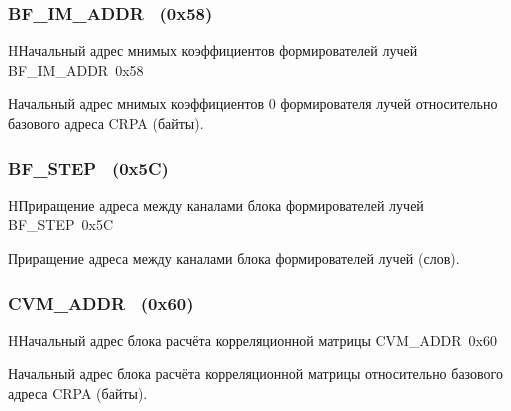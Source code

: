 \subsubsection{BF\_IM\_ADDR~ (0x58)}
\renewcommand{\regnam}{BF\_IM\_ADDR~}
\label{sec:BF_IM_ADDR}

\begin{register}{H}{Начальный адрес мнимых коэффициентов формирователей лучей \regnam}{0x58}

\label{regsamplecount}%
%
\regnewline%

\begin{regdesc}\begin{reglist}
\item [BF\_IM\_ADDR (rw)]
Начальный адрес мнимых коэффициентов 0 формирователя лучей относительно базового адреса
CRPA (байты).
\end{reglist}\end{regdesc}
\end{register}

\subsubsection{BF\_STEP~ (0x5C)}
\renewcommand{\regnam}{BF\_STEP~}
\label{sec:BF_STEP}

\begin{register}{H}{Приращение адреса между каналами блока формирователей лучей \regnam}{0x5C}

\label{regsamplecount}%
%
\regnewline%

\begin{regdesc}\begin{reglist}
\item [BF\_STEP (rw)]
Приращение адреса между каналами блока формирователей лучей (слов).
\end{reglist}\end{regdesc}
\end{register}

\subsubsection{CVM\_ADDR~ (0x60)}
\renewcommand{\regnam}{CVM\_ADDR~}
\label{sec:CVM_ADDR}

\begin{register}{H}{Начальный адрес блока расчёта корреляционной матрицы \regnam}{0x60}

  \label{regsamplecount}%
  \regnewline%

  \begin{regdesc}\begin{reglist}
    \item [CVM\_ADDR (rw)]
      Начальный адрес блока расчёта корреляционной матрицы относительно базового адреса
      CRPA (байты).
    \end{reglist}\end{regdesc}
\end{register}


